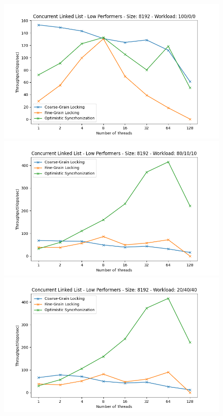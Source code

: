\documentclass[../final_report.tex]{subfiles}
\begin{document}
\begin{figure}[H]
    \centering
        \includegraphics[scale=0.4]{outFiles/plots/concurrent_data_structs_low_8192_100_0_0.png}
        \includegraphics[scale=0.4]{outFiles/plots/concurrent_data_structs_low_8192_80_10_10.png}
        \includegraphics[scale=0.4]{outFiles/plots/concurrent_data_structs_low_8192_20_40_40.png}

\end{figure}
\end{document}
